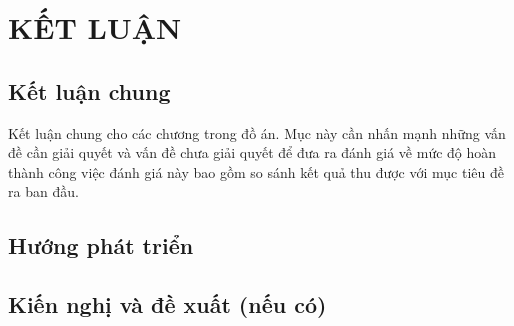 \section*{\centering KẾT LUẬN}

\subsection*{Kết luận chung}
Kết luận chung cho các chương trong đồ án. Mục này cần nhấn mạnh những vấn đề cần giải quyết và vấn đề chưa giải quyết để đưa ra đánh giá về mức độ hoàn thành công việc đánh giá này bao gồm so sánh kết quả thu được với mục tiêu đề ra ban đầu.

\subsection*{Hướng phát triển}

\subsection*{Kiến nghị và đề xuất (nếu có)}

\clearpage